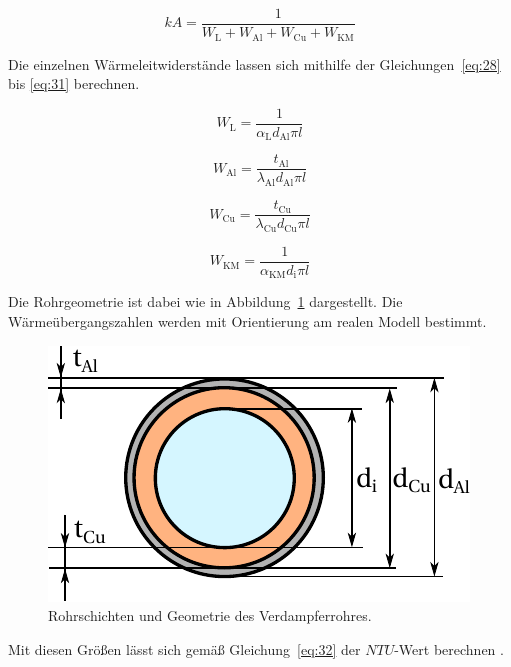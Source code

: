\begin{equation}
\label{eq:UA}
kA = \frac{1}{W_{\mathrm{L}} + W_{\mathrm{Al}} + W_{\mathrm{Cu}} + W_{\mathrm{KM}}}
\end{equation}
 
Die einzelnen Wärmeleitwiderstände lassen sich mithilfe der Gleichungen~\ref{eq:28} bis \ref{eq:31} berechnen.

\begin{equation}
\label{eq:28}
W_\mathrm{L} = \frac{1}{\alpha_{\mathrm{L}} d_{\mathrm{Al}} \pi l}
\end{equation}

\begin{equation}
\label{eq:29}
W_{\mathrm{Al}} = \frac{t_{\mathrm{Al}}}{\lambda_{\mathrm{Al}} d_{\mathrm{Al}} \pi l}
\end{equation}

\begin{equation}
\label{eq:30}
W_{\mathrm{Cu}} = \frac{t_{\mathrm{Cu}}}{\lambda_{\mathrm{Cu}} d_{\mathrm{Cu}} \pi l}
\end{equation}

\begin{equation}
\label{eq:31}
W_{\mathrm{KM}} = \frac{1}{\alpha_{\mathrm{KM}} d_{\mathrm{i}} \pi l}
\end{equation}

Die Rohrgeometrie ist dabei wie in Abbildung~\ref{fig:Geometrie} dargestellt.
Die Wärmeübergangszahlen werden mit Orientierung am realen Modell bestimmt.

\begin{figure}[h]
\centering
\includegraphics[scale=1]{Pictures/Rohrgeometrie.pdf}
\caption{Rohrschichten und Geometrie des Verdampferrohres.}
\label{fig:Geometrie}
\end{figure}



Mit diesen Größen lässt sich gemäß Gleichung~\ref{eq:32} der $NTU$-Wert berechnen \cite{McDonald.2012}.

